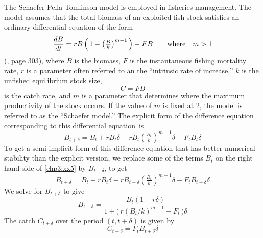 \documentclass{admbmanual}
\begin{document}
The Schaefer-Pella-Tomlinson model is employed in fisheries management. The
model assumes that the total biomass of an exploited fish stock satisfies an
ordinary differential equation of the form
\begin{equation}
\frac{dB}{dt}=rB\left(\,1-\left(\tfrac{B}{k}\right)^{m-1}\,\right)
           - FB  \qquad \hbox{\rm where}\quad m>1
\label{chp3:xx3}
\end{equation}
(\cite{hilbornwalters1992}, page 303), where $B$ is the biomass, $F$ is the
instantaneous fishing mortality rate, $r$ is a parameter often referred to an
the ``intrinsic rate of increase,'' $k$ is the unfished equilibrium stock size,
\begin{equation}
  {C=FB}
\label{chp3:xx4}
\end{equation}
is the catch rate, and $m$ is a parameter that determines where the maximum
productivity of the stock occurs. If the value of $m$ is fixed at 2, the model
is referred to as the ``Schaefer model.'' The explicit form of the difference
equation corresponding to this differential equation~is
\begin{equation}
  {B_{t+\delta}=B_t+rB_t\delta-rB_t\left(\tfrac{B_t}{k}\right)^{m-1}\delta
     - F_tB_t\delta}
  \label{chp3:xx5}
\end{equation}
To get a semi-implicit form of this difference equation that has better
numerical stability than the explicit version, we replace some of the terms
$B_t$ on the right hand side of \ref{chp3:xx5} by $B_{t+\delta}$, to get
\begin{equation}
{B_{t+\delta}
   =B_t+rB_t\delta-rB_{t+\delta}\left(\tfrac{B_t}{k}\right)^{m-1}\delta
     - F_tB_{t+\delta}\delta}
 \label{chp3:xx6}
\end{equation}
We solve for $B_{t+\delta}$ to give
\begin{equation}
{B_{t+\delta}
   =\frac{B_t(1+r\delta)}{1+\big(\,r(B_t/k)^{m-1}+F_t\,\big)\delta}}
  \label{chp3:xx7}
\end{equation}
The catch $C_{t+\delta}$ over the period $(t,t+\delta)$ is given by
\begin{equation}
 {C_{t+\delta} =F_tB_{t+\delta}\delta }
  \label{chp3:xx8}
\end{equation}
\end{document}
